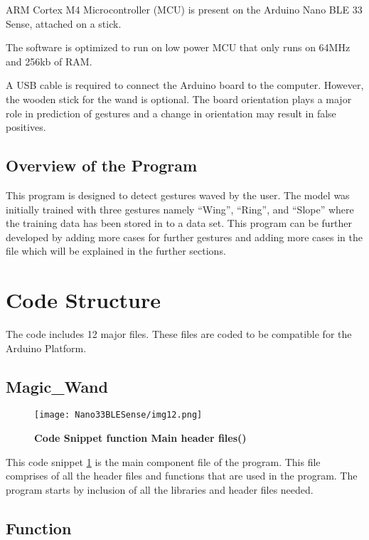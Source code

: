 ARM Cortex M4 Microcontroller (MCU) is present on the Arduino Nano BLE 33 Sense, attached on a stick. 

The software is optimized to run on low power MCU that only runs on 64MHz and 256kb of RAM.

A USB cable is required to connect the Arduino board to the computer. However,  the wooden stick for the wand is optional. The board orientation plays a major role in prediction of gestures and a change in orientation may result in false positives.



\subsection{Overview of the Program}

This program is designed to detect gestures waved by the user. The model was initially trained with three gestures namely ``Wing'', ``Ring'', and ``Slope'' where the training data has been stored in to a data set. This program can be further developed by adding more cases for further gestures and adding more cases in the file  which will be explained in the further sections. 

\section {Code Structure}

The code includes 12 major files. These files are coded to be compatible for the Arduino Platform. 

\subsection{Magic\_Wand}
\begin{figure}[h!]
    \texttt{[image: Nano33BLESense/img12.png]}
    \caption{\textbf{Code Snippet function Main header files()}}
    \label{fig:Main()}
\end{figure}


This code snippet \ref{fig:Main()} is the main component file of the program. This file comprises of all the header files and  functions that are used in the program. The program starts by inclusion of all the libraries and header files needed. 




\subsection{Function }

